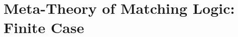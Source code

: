 \documentclass[UTF8,11pt]{article}
\theoremstyle{plain}
\theoremstyle{definition}
\theoremstyle{remark}
\newcommand{\KSort}{\mathit{KSort}}
\newcommand{\KSymbol}{\mathit{KSymbol}}
\newcommand{\KPattern}{\mathit{KPattern}}
\newcommand{\Kdeduce}{\mathit{Kprovable}}
\begin{document}
%
%
%
%

\section{Meta-Theory of Matching Logic: Finite Case}
\label{sec:meta-theory-finite}
\end{document}
